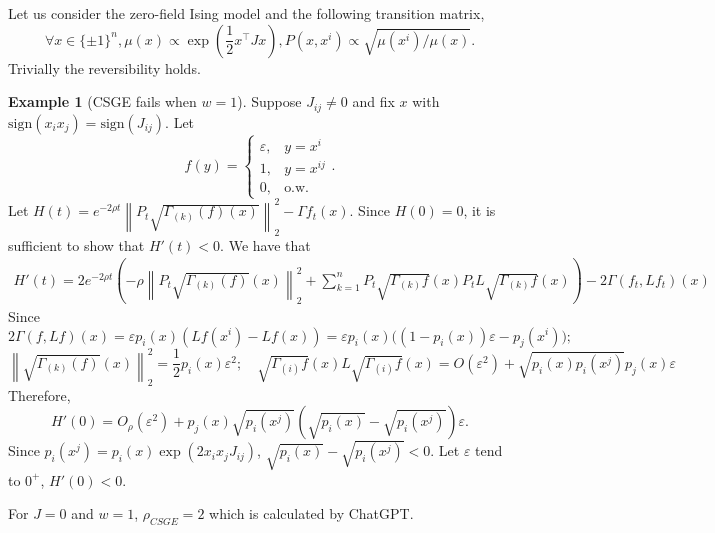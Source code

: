 \documentclass[11pt]{article}
\theoremstyle{plain}
\theoremstyle{definition}
\newtheorem{example}[theorem]{Example}
\theoremstyle{remark}
\newcommand{\norm}[1]{\left\lVert #1 \right\rVert}
\newcommand{\eps}{\varepsilon}
\newcommand{\tuple}[1]{\left(#1\right)}
\newcommand{\tp}{\tuple}
\def\-#1{\mathrm{#1}} %
\begin{document}
Let us consider the zero-field Ising model and the following transition matrix,
$$
    \forall x\in \{\pm 1\}^n, \mu(x) \propto \exp(\frac12 x^\top J x) , P(x,x^i) \propto \sqrt{\mu(x^i)/\mu(x)} .
$$
Trivially the reversibility holds.
\begin{example}[CSGE fails when $w = 1$]
    Suppose $J_{ij} \neq 0$ and fix $x$ with $\-{sign}(x_ix_j) = \-{sign}(J_{ij})$.
    Let 
    $$
        f(y) = \begin{cases}\eps, &y=x^i\\1, &y=x^{ij}\\ 0, &\text{o.w.}\end{cases} .
    $$
    Let $H(t) = e^{-2\rho t}\norm{P_t\sqrt{\Gamma_{(k)}(f)(x)}}_2^2 - \Gamma f_t(x)$.
    Since $H(0) = 0$, it is sufficient to show that $H'(t) < 0$.
    We have that 
    \begin{align*}
        H'(t) = 2e^{-2\rho t}\tp{-\rho\norm{P_t\sqrt{\Gamma_{(k)}(f)}(x)}_2^2 + \sum_{k=1}^n P_t \sqrt{\Gamma_{(k)} f}(x)P_t L \sqrt{\Gamma_{(k)} f}(x)}- 2\Gamma(f_t,Lf_t)(x)
    \end{align*}
    Since 
    $$
        2\Gamma(f,Lf)(x) = \eps p_i(x)(Lf(x^i) - Lf(x)) = \eps p_i(x)\bigg((1-p_i(x))\eps - p_j(x^i)\bigg);
    $$
    $$
        \norm{\sqrt{\Gamma_{(k)}(f)}(x)}_2^2 = \frac 12p_i(x)\eps^2; \quad \sqrt{\Gamma_{(i)} f}(x)L \sqrt{\Gamma_{(i)} f}(x) = O(\eps^2) + \sqrt{p_i(x)p_i(x^j)}p_j(x)\eps
    $$
    Therefore,
    $$
        H'(0) = O_\rho(\eps^2)+p_j(x)\sqrt{p_i(x^j)}\tp{\sqrt{p_i(x)}-\sqrt{p_i(x^j)}}\eps .
    $$
    Since $p_i(x^j) = p_i(x)\exp(2x_ix_jJ_{ij})$, $\sqrt{p_i(x)}-\sqrt{p_i(x^j)} < 0$.
    Let $\eps$ tend to $0^+$, $H'(0) < 0$.

\end{example}
For $J = 0$ and $w = 1$, $\rho_{CSGE} = 2$ which is calculated by ChatGPT.
\end{document}
